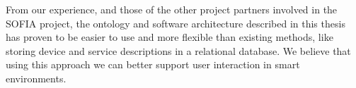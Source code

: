 From our experience, and those of the other project partners involved in the \ac{SOFIA} project, the ontology and software architecture described in this thesis has proven to be easier to use and more flexible than existing methods, like  storing device and service descriptions in a relational database. We believe that using this approach we can better support user interaction in smart environments.

	






